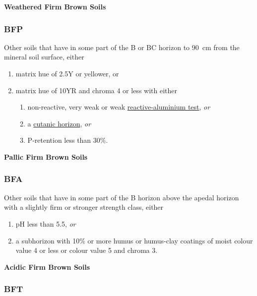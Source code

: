 \documentclass[
  letterpaper,
  DIV=11,
  numbers=noendperiod]{scrreprt}
\providecommand{\tightlist}{%
  \setlength{\itemsep}{0pt}\setlength{\parskip}{0pt}}\usepackage{longtable,booktabs,array}
\begin{document}
\textbf{Weathered Firm Brown Soils}

\hypertarget{sec-key-BFP}{%
\subsubsection{\texorpdfstring{\textbf{BFP}}{BFP}}\label{sec-key-BFP}}

Other soils that have in some part of the B or BC horizon to 90~cm from
the mineral soil surface, either

\begin{enumerate}
\def\labelenumi{\arabic{enumi}.}
\tightlist
\item
  matrix hue of 2.5Y or yellower, or
\item
  matrix hue of 10YR and chroma 4 or less with either

  \begin{enumerate}
  \def\labelenumii{(\alph{enumii})}
  \tightlist
  \item
    non-reactive, very weak or weak
    \protect\hyperlink{sec-diag-naf}{reactive-aluminium test}, \emph{or}
  \item
    a \protect\hyperlink{sec-diag-cuth}{cutanic horizon}, \emph{or}
  \item
    P-retention less than 30\%.
  \end{enumerate}
\end{enumerate}

\textbf{Pallic Firm Brown Soils}

\hypertarget{sec-key-BFA}{%
\subsubsection{\texorpdfstring{\textbf{BFA}}{BFA}}\label{sec-key-BFA}}

Other soils that have in some part of the B horizon above the apedal
horizon with a slightly firm or stronger strength class, either

\begin{enumerate}
\def\labelenumi{\arabic{enumi}.}
\tightlist
\item
  pH less than 5.5, \emph{or}
\item
  a subhorizon with 10\% or more humus or humus-clay coatings of moist
  colour value 4 or less or colour value 5 and chroma 3.
\end{enumerate}

\textbf{Acidic Firm Brown Soils}

\hypertarget{sec-key-BFT}{%
\subsubsection{\texorpdfstring{\textbf{BFT}}{BFT}}\label{sec-key-BFT}}
\end{document}
